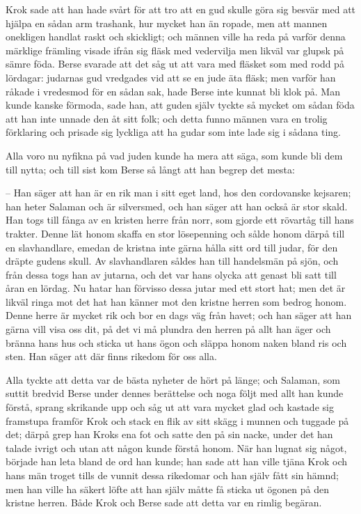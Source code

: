 \initial Krok sade att han hade svårt för att tro att en gud skulle göra sig besvär med att hjälpa en sådan arm trashank, hur mycket han än ropade, men att mannen onekligen handlat raskt och skickligt; och männen ville ha reda på varför denna märklige främling visade ifrån sig fläsk med vedervilja men likväl var glupsk på sämre föda. Berse svarade att det såg ut att vara med fläsket som med rodd på lördagar: judarnas gud vredgades vid att se en jude äta fläsk; men varför han råkade i vredesmod för en sådan sak, hade Berse inte kunnat bli klok på. Man kunde kanske förmoda, sade han, att guden själv tyckte så mycket om sådan föda att han inte unnade den åt sitt folk; och detta funno männen vara en trolig förklaring och prisade sig lyckliga att ha gudar som inte lade sig i sådana ting.

\initial Alla voro nu nyfikna på vad juden kunde ha mera att säga, som kunde bli dem till nytta; och till sist kom Berse så långt att han begrep det mesta:

– Han säger att han är en rik man i sitt eget land, hos den cordovanske kejsaren; han heter Salaman och är silversmed, och han säger att han också är stor skald. Han togs till fånga av en kristen herre från norr, som gjorde ett rövartåg till hans trakter. Denne lät honom skaffa en stor lösepenning och sålde honom därpå till en slavhandlare, emedan de kristna inte gärna hålla sitt ord till judar, för den dräpte gudens skull. Av slavhandlaren såldes han till handelsmän på sjön, och från dessa togs han av jutarna, och det var hans olycka att genast bli satt till åran en lördag. Nu hatar han förvisso dessa jutar med ett stort hat; men det är likväl ringa mot det hat han känner mot den kristne herren som bedrog honom. Denne herre är mycket rik och bor en dags väg från havet; och han säger att han gärna vill visa oss dit, på det vi må plundra den herren på allt han äger och bränna hans hus och sticka ut hans ögon och släppa honom naken bland ris och sten. Han säger att där finns rikedom för oss alla.

\initial Alla tyckte att detta var de bästa nyheter de hört på länge; och Salaman, som suttit bredvid Berse under dennes berättelse och noga följt med allt han kunde förstå, sprang skrikande upp och såg ut att vara mycket glad och kastade sig framstupa framför Krok och stack en flik av sitt skägg i munnen och tuggade på det; därpå grep han Kroks ena fot och satte den på sin nacke, under det han talade ivrigt och utan att någon kunde förstå honom. När han lugnat sig något, började han leta bland de ord han kunde; han sade att han ville tjäna Krok och hans män troget tills de vunnit dessa rikedomar och han själv fått sin hämnd; men han ville ha säkert löfte att han själv måtte få sticka ut ögonen på den kristne herren. Både Krok och Berse sade att detta var en rimlig begäran.

